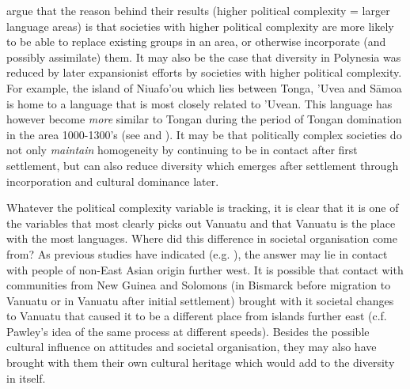 \documentclass[unnumsec,webpdf,modern,medium]{oup-authoring-template}
\begin{document}
\citet{curriemace2009} argue that the reason behind their results (higher political complexity = larger language areas) is that societies with higher political complexity are more likely to be able to replace existing groups in an area, or otherwise incorporate (and possibly assimilate) them. It may also be the case that diversity in Polynesia was reduced by later expansionist efforts by societies with higher political complexity. For example, the island of Niuafo'ou which lies between Tonga, 'Uvea and S\={a}moa is home to a language that is most closely related to 'Uvean. This language has however become \emph{more} similar to Tongan during the period of Tongan domination in the area 1000-1300's (see \citet{aswani1998tongan} and \citep[2-9]{tuskamoto_niuafoou}). It may be that politically complex societies do not only \emph{maintain} homogeneity by continuing to be in contact after first settlement, but can also reduce diversity which emerges after settlement through incorporation and cultural dominance later.

Whatever the political complexity variable is tracking, it is clear that it is one of the variables that most clearly picks out Vanuatu and that Vanuatu is the place with the most languages. Where did this difference in societal organisation come from? As previous studies have indicated (e.g. \citet{lynch1981melanesian}), the answer may lie in contact with people of non-East Asian origin further west. It is possible that contact with communities from New Guinea and Solomons (in Bismarck before migration to Vanuatu or in Vanuatu after initial settlement) brought with it societal changes to Vanuatu that caused it to be a different place from islands further east (c.f. Pawley's idea of the same process at different speeds). Besides the possible cultural influence on attitudes and societal organisation, they may also have brought with them their own cultural heritage which would add to the diversity in itself.


\end{document}
